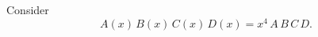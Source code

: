 \documentclass{article}
\begin{document}
Consider
\begin{equation}
A(x)\,B(x)\,C(x)\,D(x) = x^4\,A\,B\,C\,D .
\label{eq:four}
\end{equation}
\end{document}
